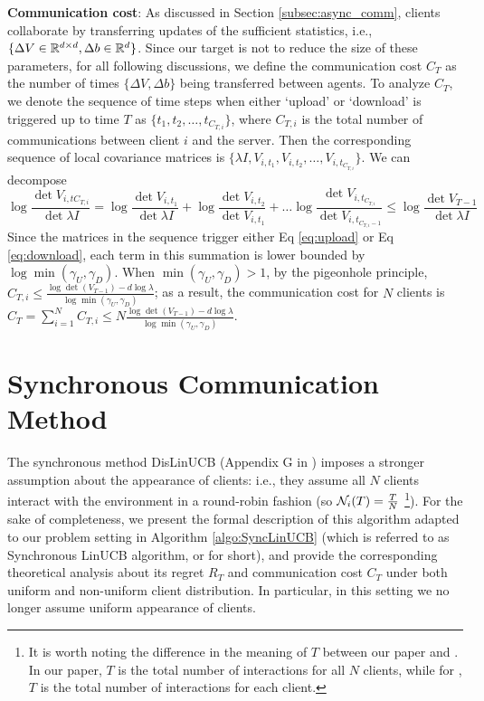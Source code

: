 \noindent \textbf{Communication cost}:
As discussed in Section \ref{subsec:async_comm}, clients collaborate by transferring updates of the sufficient statistics, i.e., $\{ \Delta V \in \mathbb{R}^{d \times d},\Delta b \in \mathbb{R}^{d}\}$. Since our target is not to reduce the size of these parameters, for all following discussions, we define the communication cost $C_{T}$ as the number of times $\{ \Delta V,\Delta b\}$ being transferred between agents.
To analyze $C_{T}$, we denote the sequence of time steps when either `upload' or `download' is triggered up to time $T$ as $\{t_{1},t_{2},\dots,t_{C_{T,i}}\}$, where $C_{T,i}$ is the total number of communications between client $i$ and the server.
Then the corresponding sequence of local covariance matrices is $\{\lambda I,V_{i,t_{1}},V_{i,t_{2}},\dots,V_{i,t_{C_{T,i}}}\}$. 
We can decompose $$\log{\frac{\det{V_{i,t{C_{T,i}}}}}{\det{\lambda I}}}=\log{\frac{\det{V_{i,t_{1}}}}{\det{\lambda I}}} + \log{\frac{\det{V_{i,t_{2}}}}{\det{V_{i,t_{1}}}}}+\dots\log{\frac{\det{V_{i,t_{C_{T,i}}}}}{\det{V_{i,t_{C_{T,i}-1}}}}} \leq \log{\frac{\det{{V}_{T-1}}}{\det{\lambda I}}}$$
Since the matrices in the sequence trigger either Eq \eqref{eq:upload} or Eq \eqref{eq:download}, each term in this summation is lower bounded by $\log{\min(\gamma_{U},\gamma_{D})}$. When $\min(\gamma_{U},\gamma_{D})>1$, by the pigeonhole principle, $C_{T,i} \leq \frac{\log \det({V}_{T-1})-d \log \lambda}{\log \min(\gamma_{U},\gamma_{D})}$; as a result, the communication cost for $N$ clients is 
$C_{T} =\sum_{i=1}^{N} C_{T,i} \leq N \frac{\log{\det({V}_{T-1})}-d \log{\lambda}}{\log{\min{(\gamma_{U},\gamma_{D})}}}$.

\section{Synchronous Communication Method} \label{sec:sync_method}
The synchronous method DisLinUCB (Appendix G in \cite{wang2019distributed}) imposes a stronger assumption about the appearance of clients: i.e., they assume all $N$ clients interact with the environment in a round-robin fashion (so $\mathcal{N}_{i}(T)=\frac{T}{N}$ \footnote{It is worth noting the difference in the meaning of $T$ between our paper and \cite{wang2019distributed}. In our paper, $T$ is the total number of interactions for all $N$ clients, while for \cite{wang2019distributed}, $T$ is the total number of interactions for each client.}). 
For the sake of completeness, we present the formal description of this algorithm adapted to our problem setting in Algorithm \ref{algo:SyncLinUCB} (which is referred to as Synchronous LinUCB algorithm, or \modelbaseline{} for short), and provide the corresponding theoretical analysis about its regret $R_{T}$ and communication cost $C_{T}$ under both uniform and non-uniform client distribution. In particular, in this setting we no longer assume uniform appearance of clients. 

